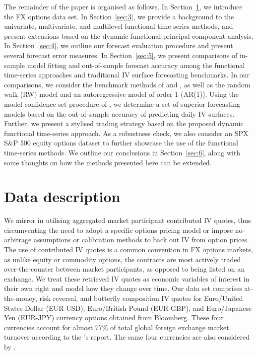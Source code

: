\documentclass[12pt,a4paper]{article}
\begin{document}
The remainder of the paper is organised as follows. In Section~\ref{sec:2}, we introduce the FX options data set. In Section~\ref{sec:3}, we provide a background to the univariate, multivariate, and multilevel functional time-series methods, and present extensions based on the dynamic functional principal component analysis. In Section~\ref{sec:4}, we outline our forecast evaluation procedure and present several forecast error measures. In Section~\ref{sec:5}, we present comparisons of in-sample model fitting and out-of-sample forecast accuracy among the functional time-series approaches and traditional IV surface forecasting benchmarks. In our comparisons, we consider the benchmark methods of \cite{CT11} and \cite{GG06}, as well as the random walk (RW) model and an autoregressive model of order 1 (AR(1)). Using the model confidence set procedure of \cite{HLN11}, we determine a set of superior forecasting models based on the out-of-sample accuracy of predicting daily IV surfaces. Further, we present a stylised trading strategy based on the proposed dynamic functional time-series approach. As a robustness check, we also consider an SPX S\&P 500 equity options dataset to further showcase the use of the functional time-series methods. We outline our conclusions in Section~\ref{sec:6}, along with some thoughts on how the methods presented here can be extended.

\section{Data description}\label{sec:2}

We mirror \cite{KCM18} in utilising aggregated market participant contributed IV quotes, thus circumventing the need to adopt a specific options pricing model or impose no-arbitrage assumptions or calibration methods to back out IV from option prices. The use of contributed IV quotes is a common convention in FX options markets, as unlike equity or commodity options, the contracts are most actively traded over-the-counter between market participants, as opposed to being listed on an exchange. We treat these retrieved IV quotes as economic variables of interest in their own right and model how they change over time. Our data set comprises at-the-money, risk reversal, and butterfly composition IV quotes for Euro/United States Dollar (EUR-USD), Euro/British Pound (EUR-GBP), and Euro/Japanese Yen (EUR-JPY) currency options obtained from Bloomberg. These four currencies account for almost 77\% of total global foreign exchange market turnover according to the \citeauthor{BIS16}'s \citeyearpar{BIS16} report. The same four currencies are also considered by \cite{CT11}.
\end{document}
